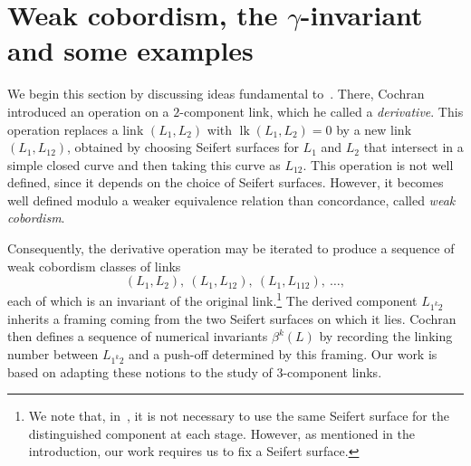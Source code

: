 \documentclass[a4paper, 11pt]{amsart}
\theoremstyle{definition}
\newcommand{\lk}{\operatorname{lk}}
\begin{document}






\section{Weak cobordism, the $\gamma$-invariant and some examples}\label{sec:weakcobordism}

We begin this section by discussing ideas fundamental to~\cite{C3}. There, Cochran introduced an operation on a $2$-component link, which he called a \emph{derivative}. This operation replaces a link $(L_1,L_2)$ with $\lk(L_1,L_2)=0$ by a new link $(L_1,L_{12})$, obtained by choosing Seifert surfaces for $L_1$ and $L_2$ that intersect in a simple closed curve and then taking this curve as $L_{12}$. This operation is not well defined, since it depends on the choice of Seifert surfaces. However, it becomes well defined modulo a weaker equivalence relation than concordance, called \emph{weak cobordism}.

Consequently, the derivative operation may be iterated to produce a sequence of weak cobordism classes of links
\[
(L_1,L_2),\ (L_1,L_{12}),\ (L_1,L_{112}),\ \dots,
\]
each of which is an invariant of the original link.\footnote{We note that, in~\cite{C3}, it is not necessary to use the same Seifert surface for the distinguished component at each stage. However, as mentioned in the introduction, 
our work
requires us to fix a Seifert surface.}
The derived component $L_{1^k2}$ inherits a framing coming from the two Seifert surfaces on which it lies. Cochran then defines a sequence of numerical invariants $\beta^k(L)$ by recording the linking number between $L_{1^k2}$ and a push-off determined by this framing. Our work is based on adapting these notions to the study of $3$-component links.
\end{document}

